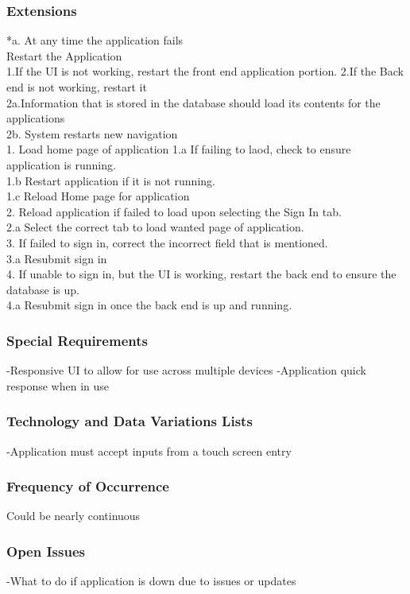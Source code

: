 \documentclass{article}
\begin{document}
	
	\subsubsection{\textbf{Extensions}}
	*a. At any time the application fails \\
	Restart the Application \\
	1.If the UI is not working, restart the front end application portion.
	2.If the Back end is not working, restart it \\
	2a.Information that is stored in the database should load its contents for the applications \\
	2b. System restarts new navigation \\
	1. Load home page of application
	1.a  If failing to laod, check to ensure application is running. \\
	1.b Restart application if it is not running. \\
	1.c Reload Home page for application \\
	2. Reload application if failed to load upon selecting the Sign In tab. \\
	2.a Select the correct tab to load wanted page of application.\\
	3. If failed to sign in, correct the incorrect field that is mentioned. \\
	3.a Resubmit sign in\\
	4. If unable to sign in, but the UI is working, restart the back end to ensure the database is up. \\
	4.a Resubmit sign in once the back end is up and running.
	
	\subsubsection{\textbf{Special Requirements}}
	-Responsive UI to allow for use across multiple devices
	-Application quick response when in use
	\subsubsection{\textbf{Technology and Data Variations Lists}}
	-Application must accept inputs from a touch screen entry
	\subsubsection{\textbf{Frequency of Occurrence}}
	Could be nearly continuous
	\subsubsection{\textbf{Open Issues}}
	-What to do if application is down due to issues or updates
	
\end{document}

